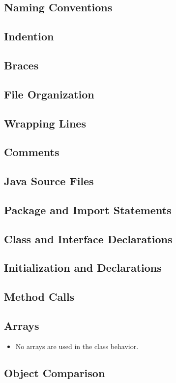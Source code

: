 

\subsection{Naming Conventions}
\subsection{Indention}
\subsection{Braces}
\subsection{File Organization}
\subsection{Wrapping Lines}
\subsection{Comments}
\subsection{Java Source Files}
\subsection{Package and Import Statements}
\subsection{Class and Interface Declarations}
\subsection{Initialization and Declarations}
\subsection{Method Calls}
\subsection{Arrays}
\begin{itemize}
	\item No arrays are used in the class behavior.
\end{itemize}
\subsection{Object Comparison}
